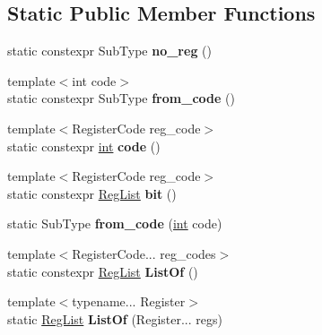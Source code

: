 \subsection*{Static Public Member Functions}
\begin{DoxyCompactItemize}
\item 
\mbox{\label{classv8_1_1internal_1_1RegisterBase_a99d34fe5d17363e2c57ab0a3dab22305}} 
static constexpr Sub\+Type {\bfseries no\+\_\+reg} ()
\item 
\mbox{\label{classv8_1_1internal_1_1RegisterBase_abd3562d1d0c4016e30e186fee15dbc56}} 
{\footnotesize template$<$int code$>$ }\\static constexpr Sub\+Type {\bfseries from\+\_\+code} ()
\item 
\mbox{\label{classv8_1_1internal_1_1RegisterBase_a69ead19534f9f02d208c08e9f933b75a}} 
{\footnotesize template$<$Register\+Code reg\+\_\+code$>$ }\\static constexpr \mbox{\hyperlink{classint}{int}} {\bfseries code} ()
\item 
\mbox{\label{classv8_1_1internal_1_1RegisterBase_add92777161d96225c9ac8f0e76f9b6d5}} 
{\footnotesize template$<$Register\+Code reg\+\_\+code$>$ }\\static constexpr \mbox{\hyperlink{classuint32__t}{Reg\+List}} {\bfseries bit} ()
\item 
\mbox{\label{classv8_1_1internal_1_1RegisterBase_ab99867f6a09563711cc66bb2053f735b}} 
static Sub\+Type {\bfseries from\+\_\+code} (\mbox{\hyperlink{classint}{int}} code)
\item 
\mbox{\label{classv8_1_1internal_1_1RegisterBase_a7981ceef9da8682fdec0ad51e68984a3}} 
{\footnotesize template$<$Register\+Code... reg\+\_\+codes$>$ }\\static constexpr \mbox{\hyperlink{classuint32__t}{Reg\+List}} {\bfseries List\+Of} ()
\item 
\mbox{\label{classv8_1_1internal_1_1RegisterBase_a931699829e487ea940722ce3246fc0c8}} 
{\footnotesize template$<$typename... Register$>$ }\\static \mbox{\hyperlink{classuint32__t}{Reg\+List}} {\bfseries List\+Of} (Register... regs)
\end{DoxyCompactItemize}

